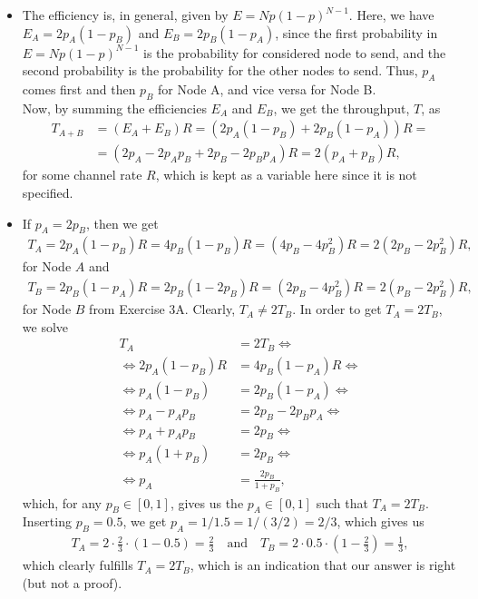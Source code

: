 \documentclass[10pt]{article}
\begin{document}
\begin{itemize}
  \item The efficiency is, in general, given by $E=Np(1-p)^{N-1}$. Here, we have $E_A=2p_A(1-p_B)$ and $E_B=2p_B(1-p_A)$, since the first probability in $E=Np(1-p)^{N-1}$ is the probability for considered node to send, and the second probability is the probability for the other nodes to send. Thus, $p_A$ comes first and then $p_B$ for Node A, and vice versa for Node B. \\
  
  Now, by summing the efficiencies $E_A$ and $E_B$, we get the throughput, $T$, as
  \begin{align*}
    T_{A+B}&=(E_A+E_B)R=(2p_A(1-p_B)+2p_B(1-p_A))R=\\
    &=(2p_A-2p_Ap_B+2p_B-2p_Bp_A)R=2(p_A+p_B)R,
  \end{align*}
  for some channel rate $R$, which is kept as a variable here since it is not specified.
  \item If $p_A=2p_B$, then we get 
  \begin{align*}
    T_A=2p_A(1-p_B)R=4p_B(1-p_B)R=(4p_B-4p_B^2)R=2(2p_B-2p_B^2)R,
  \end{align*}
  for Node $A$ and
  \begin{align*}
    T_B=2p_B(1-p_A)R=2p_B(1-2p_B)R=(2p_B-4p_B^2)R=2(p_B-2p_B^2)R,
  \end{align*}
  for Node $B$ from Exercise 3A. Clearly, $T_A\neq 2T_B$. In order to get $T_A=2T_B$, we solve
  \begin{align*}
    T_A&=2T_B\Leftrightarrow\\
    \Leftrightarrow 2p_A(1-p_B)R&=4p_B(1-p_A)R\Leftrightarrow\\
    \Leftrightarrow p_A(1-p_B)&=2p_B(1-p_A)\Leftrightarrow\\
    \Leftrightarrow p_A-p_Ap_B&=2p_B-2p_Bp_A\Leftrightarrow\\
    \Leftrightarrow p_A+p_Ap_B&=2p_B\Leftrightarrow \\
    \Leftrightarrow p_A(1+p_B)&=2p_B\Leftrightarrow \\
    \Leftrightarrow p_A&=\frac{2p_B}{1+p_B},
  \end{align*}
  which, for any $p_B\in[0,1]$, gives us the $p_A\in[0,1]$ such that $T_A=2T_B$. \\
  
  Inserting $p_B=0.5$, we get $p_A=1/1.5=1/(3/2)=2/3$, which gives us
  \begin{align*}
    T_A=2\cdot\frac{2}{3}\cdot(1-0.5)=\frac{2}{3}\quad\text{and}\quad T_B=2\cdot0.5\cdot(1-\frac{2}{3})=\frac{1}{3},
  \end{align*}
  which clearly fulfills $T_A=2T_B$, which is an indication that our answer is right (but not a proof).
\end{itemize}
\end{document}
